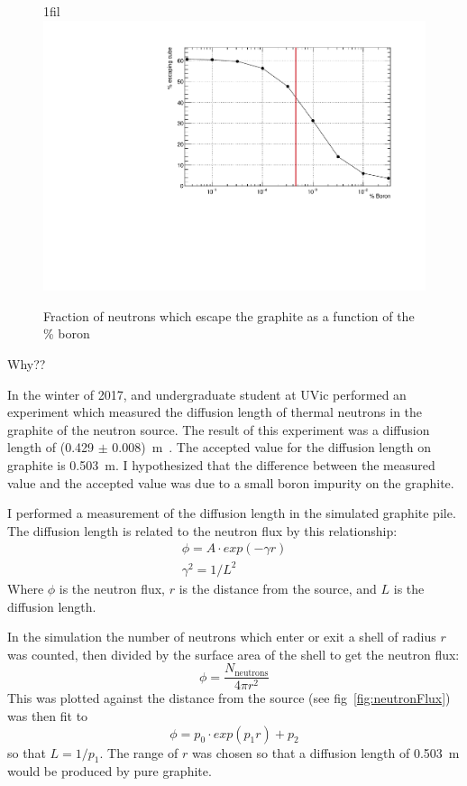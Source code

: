 \documentclass{article}
\makeatletter
\newcommand*{\centerfloat}{%
  \parindent \z@
  \leftskip \z@ \@plus 1fil \@minus \textwidth
  \rightskip\leftskip
  \parfillskip \z@skip}
\makeatother
\begin{document}
\begin{figure}
	\centerfloat
	\includegraphics[width=\columnwidth]{images/BoronEscape}
	\caption{Fraction of neutrons which escape the graphite as a function of the \% boron}	
	\label{fig:boronExcape}
\end{figure}



	Why??

	In the winter of 2017, and undergraduate student at UVic performed an experiment which measured the diffusion length of thermal neutrons in the graphite of the neutron source. The result of this experiment was a diffusion length of (0.429 $\pm$ 0.008)~m~\cite{undergradExpt}. The accepted value for the diffusion length on graphite is 0.503~m. I hypothesized that the difference between the measured value and the accepted value was due to a small boron impurity on the graphite. 




	I performed a measurement of the diffusion length in the simulated graphite pile. The diffusion length is related to the neutron flux by this relationship:
\begin{subequations}
\begin{align}
		{\phi = A\cdot exp(-\gamma r)}\\
		{\gamma^2 = 1/L^2}
\end{align}
\end{subequations}
Where $\phi$ is the neutron flux, $r$ is the distance from the source, and $L$ is the diffusion length.

	In the simulation the number of neutrons which enter or exit a shell of radius $r$ was counted, then divided by the surface area of the shell to get the neutron flux:
\begin{equation}
	{\phi = \frac{N_{\mathrm{neutrons}}} {4\pi r^2}   }
\end{equation}
This was plotted against the distance from the source (see fig~\ref{fig:neutronFlux}) was then fit to 
\begin{equation}
	{\phi = p_{0}\cdot exp(p_{1} r) + p_{2}}
\end{equation}
so that $L=1/p_{1}$. The range of $r$ was chosen so that a diffusion length of 0.503~m would be produced by pure graphite.
\end{document}
